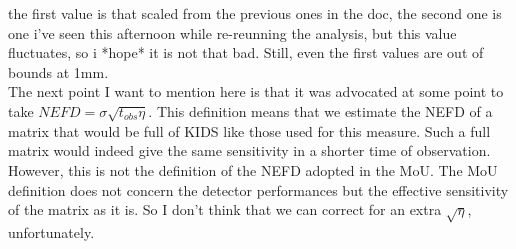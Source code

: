 the first value is that scaled from the previous ones in the doc, the second one
is one i've seen this afternoon while re-reunning the analysis, but this value
fluctuates, so i *hope* it is not that bad. Still, even the first values are out
of bounds at 1mm.\\

The next point I want to mention here is that it was advocated at some point to
take $NEFD = \sigma \sqrt{t_{obs}\eta}$. This definition means that we estimate
the NEFD of a matrix that would be full of KIDS like those used for this
measure. Such a full matrix would indeed give the same sensitivity in a shorter
time of observation. However, this is not the definition of the NEFD adopted in
the MoU. The MoU definition does not concern the detector performances but the
effective sensitivity of the matrix as it is. So I don't think that we can
correct for an extra $\sqrt{\eta}$, unfortunately.





\newpage



